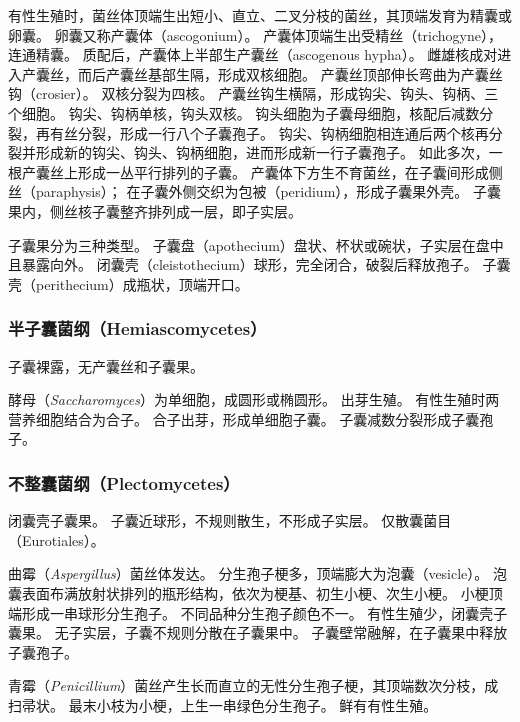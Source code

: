 \documentclass[11pt]{article}
\begin{document}
有性生殖时，菌丝体顶端生出短小、直立、二叉分枝的菌丝，其顶端发育为精囊或卵囊。
卵囊又称产囊体（ascogonium）。
产囊体顶端生出受精丝（trichogyne），连通精囊。
质配后，产囊体上半部生产囊丝（ascogenous hypha）。
雌雄核成对进入产囊丝，而后产囊丝基部生隔，形成双核细胞。
产囊丝顶部伸长弯曲为产囊丝钩（crosier）。
双核分裂为四核。
产囊丝钩生横隔，形成钩尖、钩头、钩柄、三个细胞。
钩尖、钩柄单核，钩头双核。
钩头细胞为子囊母细胞，核配后减数分裂，再有丝分裂，形成一行八个子囊孢子。
钩尖、钩柄细胞相连通后两个核再分裂并形成新的钩尖、钩头、钩柄细胞，进而形成新一行子囊孢子。
如此多次，一根产囊丝上形成一丛平行排列的子囊。
产囊体下方生不育菌丝，在子囊间形成侧丝（paraphysis）；
在子囊外侧交织为包被（peridium），形成子囊果外壳。
子囊果内，侧丝核子囊整齐排列成一层，即子实层。

\newline

子囊果分为三种类型。
子囊盘（apothecium）盘状、杯状或碗状，子实层在盘中且暴露向外。
闭囊壳（cleistothecium）球形，完全闭合，破裂后释放孢子。
子囊壳（perithecium）成瓶状，顶端开口。

\subsubsection{半子囊菌纲（Hemiascomycetes）}
子囊裸露，无产囊丝和子囊果。

\newline

酵母（\textit{Saccharomyces}）为单细胞，成圆形或椭圆形。
出芽生殖。
有性生殖时两营养细胞结合为合子。
合子出芽，形成单细胞子囊。
子囊减数分裂形成子囊孢子。

\subsubsection{不整囊菌纲（Plectomycetes）}
闭囊壳子囊果。
子囊近球形，不规则散生，不形成子实层。
仅散囊菌目（Eurotiales）。

\newline

曲霉（\textit{Aspergillus}）菌丝体发达。
分生孢子梗多，顶端膨大为泡囊（vesicle）。
泡囊表面布满放射状排列的瓶形结构，依次为梗基、初生小梗、次生小梗。
小梗顶端形成一串球形分生孢子。
不同品种分生孢子颜色不一。
有性生殖少，闭囊壳子囊果。
无子实层，子囊不规则分散在子囊果中。
子囊壁常融解，在子囊果中释放子囊孢子。

\newline

青霉（\textit{Penicillium}）菌丝产生长而直立的无性分生孢子梗，其顶端数次分枝，成扫帚状。
最末小枝为小梗，上生一串绿色分生孢子。
鲜有有性生殖。
\end{document}

